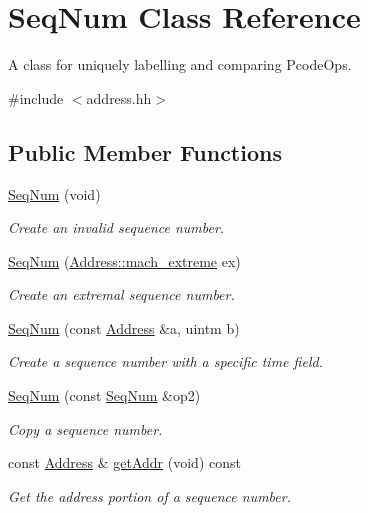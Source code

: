 \hypertarget{class_seq_num}{}\section{Seq\+Num Class Reference}
\label{class_seq_num}


A class for uniquely labelling and comparing Pcode\+Ops.  




{\ttfamily \#include $<$address.\+hh$>$}

\subsection*{Public Member Functions}
\begin{DoxyCompactItemize}
\item 
\mbox{\hyperlink{class_seq_num_a9e03f519b494d0279ffc80591e8d66a8}{Seq\+Num}} (void)
\begin{DoxyCompactList}\small\item\em Create an invalid sequence number. \end{DoxyCompactList}\item 
\mbox{\hyperlink{class_seq_num_a7f9a1c7e68897a62f716d0b8cc4bbc5c}{Seq\+Num}} (\mbox{\hyperlink{class_address_ab6dfc48b4779dab420c4ae0bc5aaffd7}{Address\+::mach\+\_\+extreme}} ex)
\begin{DoxyCompactList}\small\item\em Create an extremal sequence number. \end{DoxyCompactList}\item 
\mbox{\hyperlink{class_seq_num_a71be5a5e1b4161200046a9c6203abcb3}{Seq\+Num}} (const \mbox{\hyperlink{class_address}{Address}} \&a, uintm b)
\begin{DoxyCompactList}\small\item\em Create a sequence number with a specific {\itshape time} field. \end{DoxyCompactList}\item 
\mbox{\hyperlink{class_seq_num_a8ff8e92a93503828a8db088c291675bf}{Seq\+Num}} (const \mbox{\hyperlink{class_seq_num}{Seq\+Num}} \&op2)
\begin{DoxyCompactList}\small\item\em Copy a sequence number. \end{DoxyCompactList}\item 
const \mbox{\hyperlink{class_address}{Address}} \& \mbox{\hyperlink{class_seq_num_a3c1ae4e878e3c4478303caf115afb85f}{get\+Addr}} (void) const
\begin{DoxyCompactList}\small\item\em Get the address portion of a sequence number. \end{DoxyCompactList}\item 

\end{DoxyCompactItemize}
